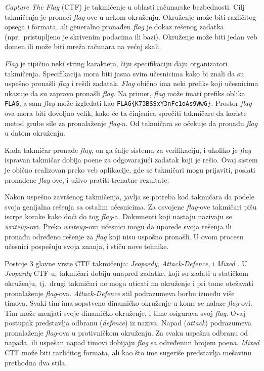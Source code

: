 \documentclass[12pt, a4paper, twocolumn]{article}
\begin{document}
\emph{Capture The Flag} (CTF) je takmičenje u oblasti računarske bezbednosti.
Cilj takmičenja je pronaći \emph{flag}-ove u nekom okruženju. Okruženje može
biti različitog opsega i formata, ali generalno pronađen \emph{flag} je dokaz
rešenog zadatka (npr.\ pristupljeno je skrivenim podacima ili bazi). Okruženje 
može biti jedan veb domen ili može biti mreža računara na većoj skali.

\emph{Flag} je tipično neki string karaktera, čiju specifikaciju daju
organizatori takmičenja. Specifikacija mora biti jasna svim učesnicima kako 
bi znali da su uspešno pronašli \emph{flag} i rešili zadatak. \emph{Flag}
obično ima neki prefiks koji učesnicima ukazuje da su zapravo pronašli 
\emph{flag}. Na primer, \emph{flag} može imati prefiks oblika \texttt{FLAG},
a sam \emph{flag} može izgledati kao \texttt{FLAG\{K73BSSxY3nFc1oAs9WwG\}}.
Prostor \emph{flag}-ova mora biti dovoljno velik, kako će ta činjenica 
sprečiti takmičare da koriste metod grube sile za pronalaženje \emph{flag}-a. 
Od takmičara se očekuje da pronađu \emph{flag} u datom okruženju.

Kada takmičar pronađe \emph{flag}, on ga šalje sistemu za verifikaciju, 
i ukoliko je \emph{flag} ispravan takmičar dobija poene za odgovarajući 
zadatak koji je rešio. Ovaj sistem je obično realizovan preko veb aplikacije, 
gde se takmičari mogu prijaviti, poslati pronađene \emph{flag}-ove, i uživo 
pratiti trenutne rezultate.

Nakon uspešno završenog takmičenja, javlja se potreba kod takmičara da podele
svoja genijalna rešenja sa ostalim učesnicima. Za osvojene \emph{flag}-ove
takmičari pišu iscrpe korake kako doći do tog \emph{flag}-a. Dokumenti koji 
nastaju nazivaju se \emph{writeup}-ovi. Preko \emph{writeup}-ova učesnici mogu 
da uporede svoja rešenja ili pronađu određeno rešenje za \emph{flag} koji 
nisu uspošno pronašli. U ovom procesu učesnici pospešuju svoja znanja, 
i stiču nove tehnike.

Postoje 3 glavne vrste CTF takmičenja: \emph{Jeopardy}, \emph{Attack-Defence},
i \emph{Mixed} \cite{ctf_time}. U \emph{Jeopardy} CTF-u, takmičari dobiju 
unapred zadatke, koji su zadati u statičkom okruženju, tj.\ drugi takmičari 
ne mogu uticati na okruženje i pri tome otežavati pronalaženje \emph{flag}-ova. 
\emph{Attack-Defence} stil podrazumeva borbu između više timova. Svaki tim 
ima sopstveno dinamičko okruženje u kome se nalaze \emph{flag}-ovi. Tim 
može menjati svoje dinamičko okruženje, i time osigurava svoj \emph{flag}. 
Ovaj postupak predstavlja odbranu (\emph{defence}) iz naziva. Napad 
(\emph{attack}) podrazumeva pronalaženje \emph{flag}-ova u protivničkom 
okruženju. Za svaku uspešnu odbranu od napada, ili uspešan napad timovi 
dobijaju \emph{flag} sa određenim brojem poena. \emph{Mixed} CTF može biti 
različitog formata, ali kao što ime sugeriše predstavlja mešavinu prethodna 
dva stila.
\end{document}
